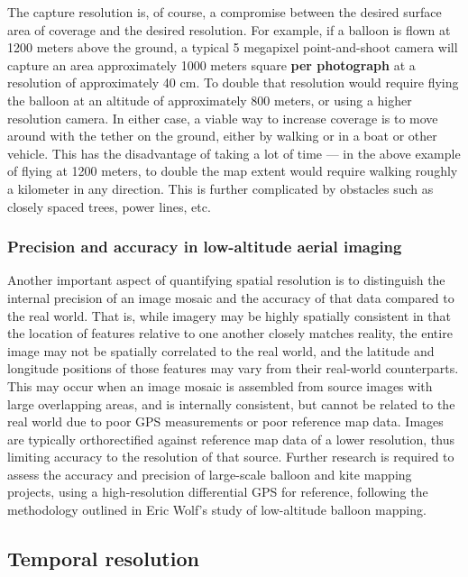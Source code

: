 \documentclass[11pt,oneside,notitlepage]{report}
\begin{document}
{{The capture resolution is, of course, a compromise between the desired surface area of coverage and the desired resolution. For example, if a balloon is flown at 1200 meters above the ground, a typical 5 megapixel point-and-shoot camera will capture an area approximately 1000 meters square \textbf{per photograph} at a resolution of approximately 40 cm. To double that resolution would require flying the balloon at an altitude of approximately 800 meters, or using a higher resolution camera. In either case, a viable way to increase coverage is to move around with the tether on the ground, either by walking or in a boat or other vehicle. This has the disadvantage of taking a lot of time --- in the above example of flying at 1200 meters, to double the map extent would require walking roughly a kilometer in any direction. This is further complicated by obstacles such as closely spaced trees, power lines, etc.

\subsubsection{Precision and accuracy in low-altitude aerial imaging}
\label{subsec:precision}

Another important aspect of quantifying spatial resolution is to distinguish the internal precision of an image mosaic and the accuracy of that data compared to the real world. That is, while imagery may be highly spatially consistent in that the location of features relative to one another closely matches reality, the entire image may not be spatially correlated to the real world, and the latitude and longitude positions of those features may vary from their real-world counterparts. This may occur when an image mosaic is assembled from source images with large overlapping areas, and is internally consistent, but cannot be related to the real world due to poor GPS measurements or poor reference map data. Images are typically orthorectified against reference map data of a lower resolution, thus limiting accuracy to the resolution of that source. Further research is required to assess the accuracy and precision of large-scale balloon and kite mapping projects, using a high-resolution differential GPS for reference, following the methodology outlined in Eric Wolf's study of low-altitude balloon mapping. \cite{wolf2006lowcost}

\subsection{Temporal resolution}

}}
\end{document}
